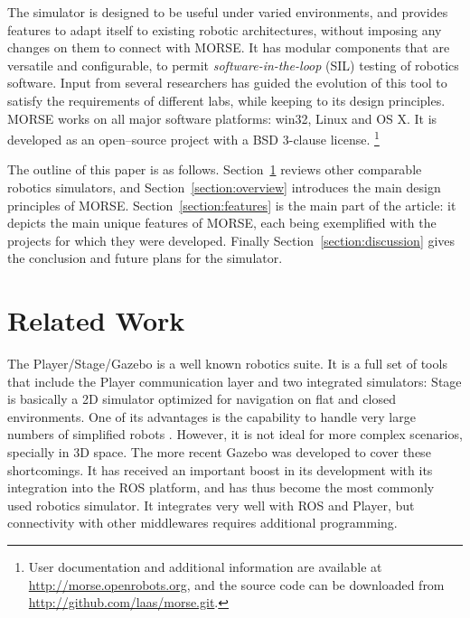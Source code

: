 \documentclass{llncs}
\newcommand{\NOTE}[1]{\textbf{NOTE:} \emph{#1} }
\begin{document}

The simulator is designed to be useful under varied environments, and provides
features to adapt itself to existing robotic architectures, without imposing
any changes on them to connect with MORSE. It has modular components
that are versatile and configurable, to permit \emph{software-in-the-loop}
(SIL) testing of robotics software.
Input from several researchers has guided the evolution of this tool to satisfy
the requirements of different labs, while keeping to its design principles.
MORSE works on all major software platforms: win32, Linux and OS X. It is
developed as an open--source project with a BSD 3-clause license.
\footnote{User documentation and additional information are available at
\url{http://morse.openrobots.org}, and the source code can be downloaded from
\url{http://github.com/laas/morse.git}.} 

The outline of this paper is as follows. Section~\ref{section:othersims} reviews
other comparable robotics simulators, and Section~\ref{section:overview}
introduces the main design principles of MORSE. Section~\ref{section:features}
is the main part of the article: it depicts the main unique features of MORSE,
each being exemplified with the projects for which they were developed. Finally
Section~\ref{section:discussion} gives the conclusion and future plans for the
simulator.

\section{Related Work}
\label{section:othersims}

The Player/Stage/Gazebo\cite{psg-1232} is a well known robotics suite.
It is a full set of tools that include the Player communication layer
and two integrated simulators: Stage \cite{Gerkey03theplayer/stage} is basically a
2D simulator optimized for navigation on flat and closed environments.
One of its advantages is the capability to handle very large numbers of
simplified robots \cite{springerlink:10.1007/s11721-008-0014-4}. However, it is
not ideal for more complex scenarios, specially in 3D space. The more recent
Gazebo \cite{Koenig04designand} was developed to cover these shortcomings.
It has received an important boost in its development with its integration
into the ROS platform, and has thus become the most commonly used robotics
simulator. It integrates very well with ROS and Player, but connectivity with
other middlewares requires additional programming.
\end{document}
